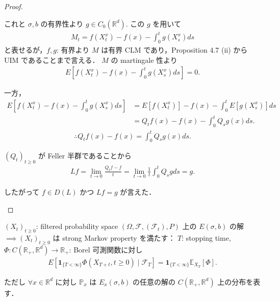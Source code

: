 \documentclass{jsarticle}
\begin{document}
\begin{proof}
\begin{enumerate}[label=(\arabic*)]
        これと $\sigma, b$ の有界性より $g\in C_{0}(\mathbb{R}^d).$
        この $g$ を用いて
        \begin{align}
            M_{t}
            = f(X_{t}^{x})
            - f(x)
            - \int_{0}^{t}g(X_{s}^{x})ds
        \end{align}
        と表せるが，$f, g$: 有界より $M$ は有界 CLM であり，Proposition 4.7 (ii) から UIM であることまで言える．
        $M$ の martingale 性より
        \begin{align}
            E[f(X_{t}^{x})
            - f(x)
            - \int_{0}^{t}g(X_{s}^{x})ds]
            = 0.
        \end{align}

        一方，
        \begin{align}
            E[f(X_{t}^{x})
            - f(x)
            - \int_{0}^{t}g(X_{s}^{x})ds]
            &= E[f(X_{t}^{x})]
            - f(x)
            - \int_{0}^{t}E[g(X_{s}^{x})]ds \\
            &= Q_{t}f(x)
            - f(x)
            - \int_{0}^{t}Q_{s}g(x)ds.
        \end{align}
        \begin{align}
            \therefore 
            Q_{t}f(x) - f(x)
            = \int_{0}^{t}Q_{s}g(x)ds.
        \end{align}

        $(Q_{t})_{t\ge0}$ が Feller 半群であることから
        \begin{align}
            Lf
            = \lim_{t\to0}\frac{Q_{t}f - f}{t}
            = \lim_{t\to0}\frac{1}{t}\int_{0}^{t}Q_{s}gds
            = g.
        \end{align}

        したがって $f\in D(L)$ かつ $Lf=g$ が言えた．
    \end{enumerate}
\end{proof}

\begin{screen}
    \begin{cor}\label{cor:808}
        $(X_{t})_{t\ge0}$: filtered probability space $(\Omega, \mathcal{F}, (\mathcal{F}_t), P)$ 上の $E(\sigma, b)$ の解 \\
        $\implies (X_{t})_{t\ge0}$ は strong Markov property を満たす：
        $T$: stopping time, $\Phi:C(\mathbb{R}_{+}, \mathbb{R}^d)\to\mathbb{R}_{+}$: Borel 可測関数に対し
        \begin{align}
            E[\bm{1}_{\{T<\infty\}}\Phi(X_{T+t}, t\ge0)\mid\mathcal{F}_{T}]
            = \bm{1}_{\{T<\infty\}}\mathbb{E}_{X_{T}}[\Phi].
        \end{align}

        ただし $\forall x\in\mathbb{R}^d$ に対し $\mathbb{P}_{x}$ は $E_{x}(\sigma, b)$ の任意の解の $C(\mathbb{R}_{+}, \mathbb{R}^d)$ 上の分布を表す．
    \end{cor}
\end{screen}
\end{document}
